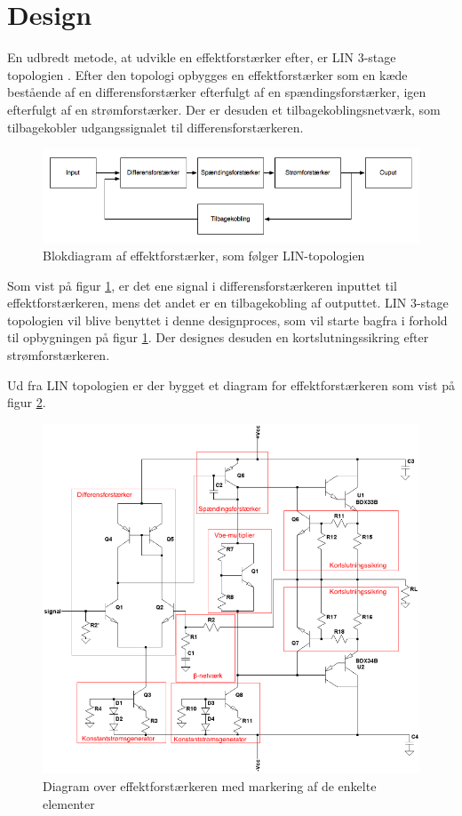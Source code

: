 \section{Design}
En udbredt metode, at udvikle en effektforstærker efter, er LIN 3-stage topologien \cite{ael-mm20}. Efter den topologi opbygges en effektforstærker som en kæde bestående af en differensforstærker efterfulgt af en spændingsforstærker, igen efterfulgt af en strømforstærker. Der er desuden et tilbagekoblingsnetværk, som tilbagekobler udgangssignalet til differensforstærkeren. 

\begin{figure}[h]
\centering
\includegraphics[scale=0.5]{teknisk/effektforstaerker/blokdiagram-effektforstaerker.png}
\caption{Blokdiagram af effektforstærker, som følger LIN-topologien}
\label{fig:lin_effektforstaerker}
\end{figure}

Som vist på figur \ref{fig:lin_effektforstaerker}, er det ene signal i differensforstærkeren inputtet til effektforstærkeren, mens det andet er en tilbagekobling af outputtet. LIN 3-stage topologien vil blive benyttet i denne designproces, som vil starte bagfra i forhold til opbygningen på figur \ref{fig:lin_effektforstaerker}. Der designes desuden en kortslutningssikring efter strømforstærkeren.

Ud fra LIN topologien er der bygget et diagram for effektforstærkeren som vist på figur \ref{fig:effektkredsloeb}.

\begin{figure}[h]
\centering
\includegraphics[width=\textwidth]{teknisk/effektforstaerker/effektforstaerker-clean.png}
\caption{Diagram over effektforstærkeren med markering af de enkelte elementer}
\label{fig:effektkredsloeb}
\end{figure}
